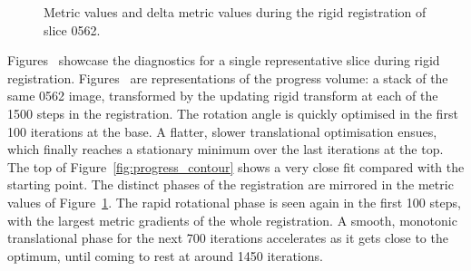   \begin{figure}[p]
    \centering
    \caption{Metric values and delta metric values during the rigid registration of slice 0562.}
    \label{fig:0562_correlation}
  \end{figure}
	
	Figures~ showcase the diagnostics for a single representative slice during rigid registration. Figures~ are representations of the progress volume: a stack of the same 0562 image, transformed by the updating rigid transform at each of the 1500 steps in the registration. The rotation angle is quickly optimised in the first 100 iterations at the base. A flatter, slower translational optimisation ensues, which finally reaches a stationary minimum over the last iterations at the top. The top of Figure~\ref{fig:progress_contour} shows a very close fit compared with the starting point. The distinct phases of the registration are mirrored in the metric values of Figure~\ref{fig:0562_correlation}. The rapid rotational phase is seen again in the first 100 steps, with the largest metric gradients of the whole registration. A smooth, monotonic translational phase for the next 700 iterations accelerates as it gets close to the optimum, until coming to rest at around 1450 iterations.
   
